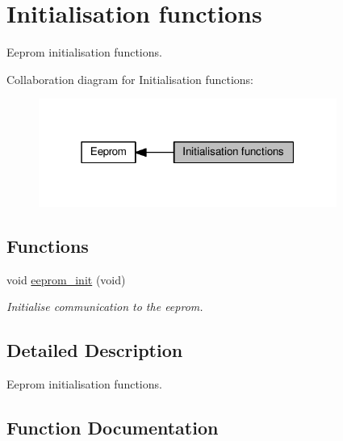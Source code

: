 \hypertarget{group___eeprom___init}{}\section{Initialisation functions}
\label{group___eeprom___init}


Eeprom initialisation functions.  


Collaboration diagram for Initialisation functions\+:\nopagebreak
\begin{figure}[H]
\begin{center}
\leavevmode
\includegraphics[width=277pt]{d7/d63/group___eeprom___init}
\end{center}
\end{figure}
\subsection*{Functions}
\begin{DoxyCompactItemize}
\item 
void \hyperlink{group___eeprom___init_ga4ec7f9d780da432051aa74ec5892a94c}{eeprom\+\_\+init} (void)
\begin{DoxyCompactList}\small\item\em Initialise communication to the eeprom. \end{DoxyCompactList}\end{DoxyCompactItemize}


\subsection{Detailed Description}
Eeprom initialisation functions. 



\subsection{Function Documentation}
